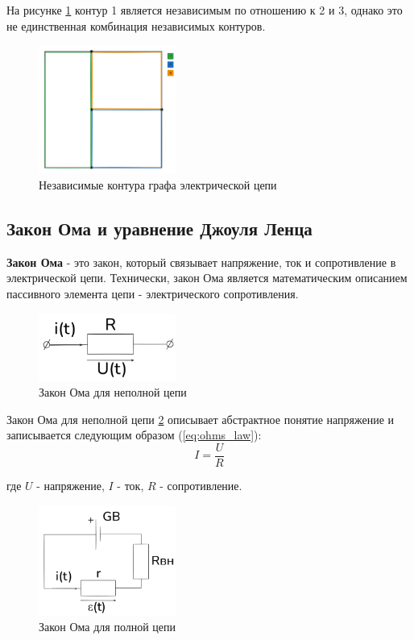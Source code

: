 На рисунке \ref{fig:graph5} контур 1 является независимым по отношению к 2 и 3, однако это не единственная комбинация независимых контуров.

\begin{figure}[H]
    \centering
    \includegraphics[width=0.4\textwidth]{images/image_5_contures_nodes_branches.png}
    \caption{Независимые контура графа электрической цепи}
    \label{fig:graph5}
\end{figure}

\subsection{Закон Ома и уравнение Джоуля Ленца}

\textbf{Закон Ома} - это закон, который связывает напряжение, ток и сопротивление в электрической цепи. Технически, закон Ома является математическим описанием пассивного элемента цепи - электрического сопротивления.

\begin{figure}[H]
    \centering
    \includegraphics[width=0.4\textwidth]{images/image_1_ohm_laws_power.png}
    \caption{Закон Ома для неполной цепи}
    \label{fig:graph6}
\end{figure}

Закон Ома для неполной цепи \ref{fig:graph6} описывает абстрактное понятие напряжение и записывается следующим образом (\ref{eq:ohms_law}):
\begin{equation}
    I = \frac{U}{R}
    \label{eq:ohms_law}
\end{equation}

где $U$ - напряжение, $I$ - ток, $R$ - сопротивление.

\begin{figure}[H]
    \centering
    \includegraphics[width=0.4\textwidth]{images/image_2_ohm_laws_power.png}
    \caption{Закон Ома для полной цепи}
    \label{fig:graph7}
\end{figure}

